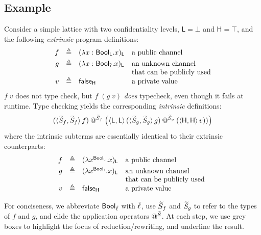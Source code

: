 \documentclass[authoryear,sort&compress,9pt,twocolumn,nocopyrightspace]{sigplanconf}
\makeatletter
\newcommand{\Bool}{\mathsf{Bool}}
\newcommand{\fff}{\textsf{false}}
\newcommand{\ff}{\fff} \newcommand{\ttt}{\textsf{true}}
\newcommand{\?}{\textsf{\upshape ?}} \newcommand{\consistent}[1]{\widetilde{#1}}
\newcommand{\ltop}{\textsf{H}}
\newcommand{\lbot}{\textsf{L}}
\newcommand{\iapp}[1]{\mathbin{@^{#1}}}
\newcommand{\evcast}[2]{#1#2}
\makeatother
\begin{document}
\subsection{Example}

Consider a simple lattice with two confidentiality levels,
$\lbot=\bot$ and $\ltop=\top$, and the following 
\emph{extrinsic} program definitions:
\begin{displaymath}
\begin{array}{rcll}
f & \triangleq & (\lambda x : {\Bool_\lbot}.x)_\lbot &
\text{a public channel}\\[1mm]
g & \triangleq & (\lambda x : {\Bool_\ul}.x)_\lbot &
\begin{tabular}[t]{@{}l@{}}
  an unknown channel \\
  that can be publicly used
\end{tabular} \\
v & \triangleq & \ff_\ltop &\text{a private value}\\
\end{array}
\end{displaymath}
$f\;v$ does not type check, but $f \; (g\; v)$ \emph{does}
typecheck, even though it fails at runtime.
Type checking yields the corresponding \emph{intrinsic} definitions:
\begin{displaymath}
(\evcast{\braket{\cS_f, \cS_f}}{f})
\iapp{\cS_f}
  \left(\evcast{\braket{\lbot,\lbot}}{(\braket{\cS_g,\cS_g}{g})}
  \iapp{\cS_g}
  (\evcast{\braket{\ltop,\ltop}}{v})) \right) \\[1mm]
\end{displaymath}
where the intrinsic subterms are essentially identical to their extrinsic 
counterparts:
\begin{displaymath}
\begin{array}{rcll}
f & \triangleq & 
(\lambda x^{\Bool_\lbot}.x)_\lbot &  \text{a public channel}\\[1mm]
g & \triangleq &
 (\lambda x^{\Bool_\ul}.x)_\lbot & 
\text{\begin{tabular}[t]{@{}l@{}}
    an unknown channel \\
    that can be publicly used
  \end{tabular}
}\\[1mm]
v & \triangleq &
 \ff_\ltop &\text{a private value}\\
\end{array}
\end{displaymath}



For conciseness, we abbreviate $\Bool_\clx$ with ${\tilde{\ell}}$, use $\cS_f$ and
$\cS_g$ to refer to the types of $f$ and $g$, and elide the application
operators $\iapp{\cS}$. At each step, we use grey boxes to highlight the focus
of reduction/rewriting, and underline the result.
\end{document}

